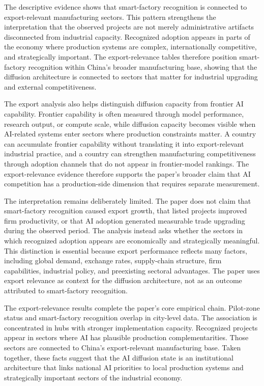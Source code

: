 \documentclass[12pt]{article}
\begin{document}
The descriptive evidence shows that smart-factory recognition is connected to export-relevant manufacturing sectors. This pattern strengthens the interpretation that the observed projects are not merely administrative artifacts disconnected from industrial capacity. Recognized adoption appears in parts of the economy where production systems are complex, internationally competitive, and strategically important. The export-relevance tables therefore position smart-factory recognition within China's broader manufacturing base, showing that the diffusion architecture is connected to sectors that matter for industrial upgrading and external competitiveness.

The export analysis also helps distinguish diffusion capacity from frontier AI capability. Frontier capability is often measured through model performance, research output, or compute scale, while diffusion capacity becomes visible when AI-related systems enter sectors where production constraints matter. A country can accumulate frontier capability without translating it into export-relevant industrial practice, and a country can strengthen manufacturing competitiveness through adoption channels that do not appear in frontier-model rankings. The export-relevance evidence therefore supports the paper's broader claim that AI competition has a production-side dimension that requires separate measurement.

The interpretation remains deliberately limited. The paper does not claim that smart-factory recognition caused export growth, that listed projects improved firm productivity, or that AI adoption generated measurable trade upgrading during the observed period. The analysis instead asks whether the sectors in which recognized adoption appears are economically and strategically meaningful. This distinction is essential because export performance reflects many factors, including global demand, exchange rates, supply-chain structure, firm capabilities, industrial policy, and preexisting sectoral advantages. The paper uses export relevance as context for the diffusion architecture, not as an outcome attributed to smart-factory recognition.

The export-relevance results complete the paper's core empirical chain. Pilot-zone status and smart-factory recognition overlap in city-level data. The association is concentrated in hubs with stronger implementation capacity. Recognized projects appear in sectors where AI has plausible production complementarities. Those sectors are connected to China's export-relevant manufacturing base. Taken together, these facts suggest that the AI diffusion state is an institutional architecture that links national AI priorities to local production systems and strategically important sectors of the industrial economy.
\end{document}
